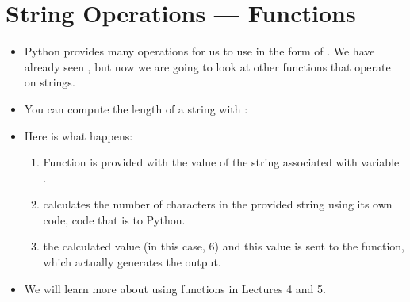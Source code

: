 \documentclass[letterpaper,10pt,english]{sphinxmanual}
\begin{document}
\section{String Operations — Functions}
\label{\detokenize{lecture_notes/lec03_strings:string-operations-functions}}\begin{itemize}
\item {} 
Python provides many operations for us to use in the form of
. We have already seen , but now we
are going to look at other functions that operate on strings.

\item {} 
You can compute the length of a string with :

\begin{sphinxVerbatim}[commandchars=\\\{\}]
  
\end{sphinxVerbatim}

\item {} 
Here is what happens:
\begin{enumerate}
\def\theenumi{\arabic{enumi}}
\def\labelenumi{\theenumi .}
\makeatletter\def\p@enumii{\p@enumi \theenumi .}\makeatother
\item {} 
Function  is provided with the value of the string associated
with variable .

\item {} 
 calculates the number of characters in the provided
string using its own code, code that is  to Python.

\item {} 
  the calculated value (in this case, 6) and
this value is sent to the  function, which actually
generates the output.

\end{enumerate}

\item {} 
We will learn more about using functions in Lectures 4 and 5.

\end{itemize}
\end{document}
